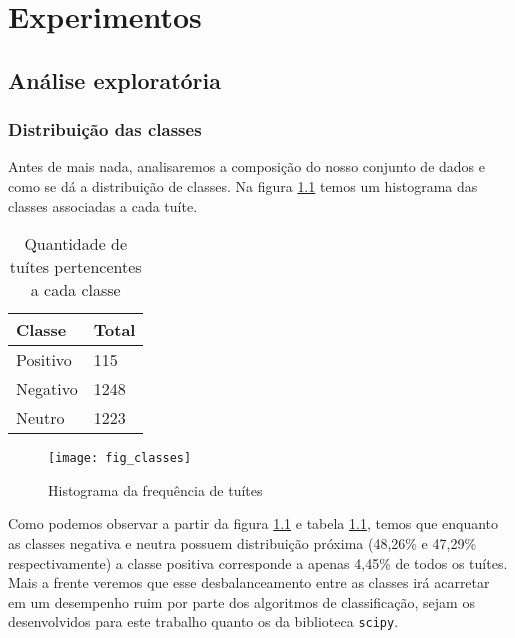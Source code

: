 \chapter{Experimentos}

\section{Análise exploratória}

\subsection{Distribuição das classes}

Antes de mais nada, analisaremos a composição do nosso conjunto de dados e como se dá
a distribuição de classes. Na figura \ref{fig:classes} temos um histograma das classes associadas
a cada tuíte.

\begin{table}[H]
	\begin{center}
		\begin{tabular}{| l | l |}
			\hline
			Classe & Total \\
			\hline
			Positivo & 115 \\
			\hline 
			Negativo & 1248 \\ 
			\hline
			Neutro & 1223 \\ 
			\hline
		\end{tabular}
	\end{center}
	\caption*{Quantidade de tuítes pertencentes a cada classe}
	\label{tab:distribution}
\end{table}

\begin{center}
	\begin{figure}[H]
		\texttt{[image: fig\_classes]}
		\caption{Histograma da frequência de tuítes}
		\label{fig:classes}
	\end{figure}
\end{center}

Como podemos observar a partir da figura \ref{fig:classes} e tabela \ref{tab:distribution}, temos
que enquanto as classes negativa e neutra possuem distribuição próxima (48,26\% e 47,29\% 
respectivamente) a classe positiva corresponde a apenas 4,45\% de todos os tuítes. Mais a frente
veremos que esse desbalanceamento entre as classes irá acarretar em um desempenho ruim por parte
dos algoritmos de classificação, sejam os desenvolvidos para este trabalho quanto os da biblioteca
\texttt{scipy}.


